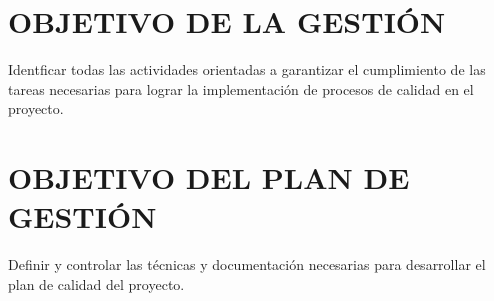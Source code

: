 \chapter{OBJETIVO DE LA GESTI\'ON}
Identficar todas las actividades orientadas a garantizar el cumplimiento de 
las tareas necesarias para lograr la implementaci\'on de procesos de calidad en el proyecto.%

\chapter{OBJETIVO DEL PLAN DE GESTI\'ON}
Definir y controlar las t\'ecnicas y documentaci\'on necesarias para desarrollar el plan de calidad del proyecto.%